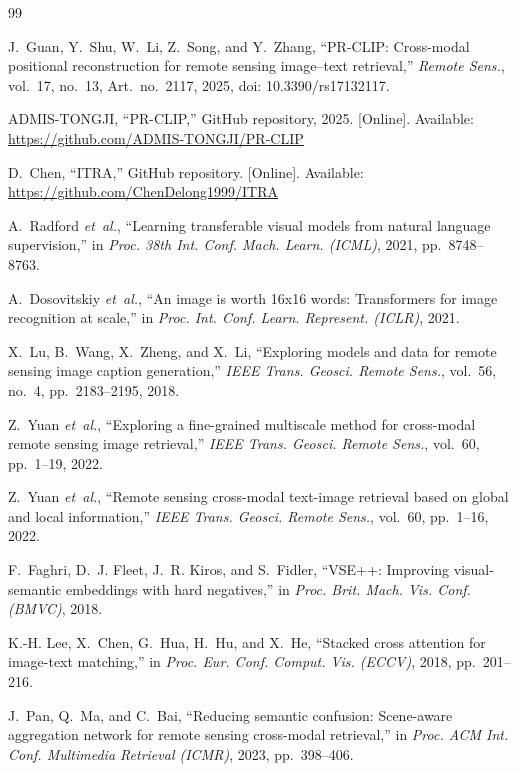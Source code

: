 \documentclass[conference]{IEEEtran}
\begin{document}
\begin{thebibliography}{99}
\footnotesize

J.~Guan, Y.~Shu, W.~Li, Z.~Song, and Y.~Zhang, ``PR-CLIP: Cross-modal positional reconstruction for remote sensing image--text retrieval,'' \emph{Remote Sens.}, vol.~17, no.~13, Art.~no.~2117, 2025, doi: 10.3390/rs17132117.

ADMIS-TONGJI, ``PR-CLIP,'' GitHub repository, 2025. [Online]. Available: \url{https://github.com/ADMIS-TONGJI/PR-CLIP}

D.~Chen, ``ITRA,'' GitHub repository. [Online]. Available: \url{https://github.com/ChenDelong1999/ITRA}

A.~Radford \emph{et~al.}, ``Learning transferable visual models from natural language supervision,'' in \emph{Proc. 38th Int. Conf. Mach. Learn. (ICML)}, 2021, pp.~8748--8763.

A.~Dosovitskiy \emph{et~al.}, ``An image is worth 16x16 words: Transformers for image recognition at scale,'' in \emph{Proc. Int. Conf. Learn. Represent. (ICLR)}, 2021.

X.~Lu, B.~Wang, X.~Zheng, and X.~Li, ``Exploring models and data for remote sensing image caption generation,'' \emph{IEEE Trans. Geosci. Remote Sens.}, vol.~56, no.~4, pp.~2183--2195, 2018.

Z.~Yuan \emph{et~al.}, ``Exploring a fine-grained multiscale method for cross-modal remote sensing image retrieval,'' \emph{IEEE Trans. Geosci. Remote Sens.}, vol.~60, pp.~1--19, 2022.

Z.~Yuan \emph{et~al.}, ``Remote sensing cross-modal text-image retrieval based on global and local information,'' \emph{IEEE Trans. Geosci. Remote Sens.}, vol.~60, pp.~1--16, 2022.

F.~Faghri, D.~J. Fleet, J.~R. Kiros, and S.~Fidler, ``VSE++: Improving visual-semantic embeddings with hard negatives,'' in \emph{Proc. Brit. Mach. Vis. Conf. (BMVC)}, 2018.

K.-H. Lee, X.~Chen, G.~Hua, H.~Hu, and X.~He, ``Stacked cross attention for image-text matching,'' in \emph{Proc. Eur. Conf. Comput. Vis. (ECCV)}, 2018, pp.~201--216.

J.~Pan, Q.~Ma, and C.~Bai, ``Reducing semantic confusion: Scene-aware aggregation network for remote sensing cross-modal retrieval,'' in \emph{Proc. ACM Int. Conf. Multimedia Retrieval (ICMR)}, 2023, pp.~398--406.


\end{thebibliography}
\end{document}
